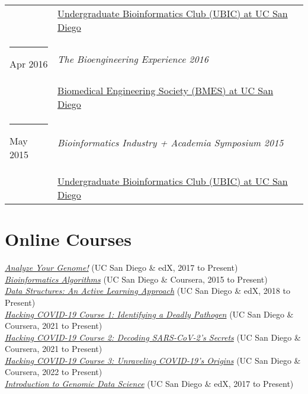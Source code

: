 \documentclass[margin,line]{res}
\begin{document}
\begin{resume}
\begin{longtable}{@{}p{0.7in}p{4in}}
\hspace*{-4mm} & \hspace{4mm} \href{http://ubicucsd.github.io/}{Undergraduate Bioinformatics Club (UBIC) at UC San Diego}\\
\hspace*{-4mm} \rule{-1mm}{5mm} Apr 2016 & \textit{The Bioengineering Experience 2016}\\*
\hspace*{-4mm} & \hspace{4mm} \href{http://bmes.ucsd.edu/}{Biomedical Engineering Society (BMES) at UC San Diego}\\
\hspace*{-4mm} \rule{-1mm}{5mm} May 2015 & \textit{Bioinformatics Industry + Academia Symposium 2015}\\*
\hspace*{-4mm} & \hspace{4mm} \href{http://ubicucsd.github.io/}{Undergraduate Bioinformatics Club (UBIC) at UC San Diego}\\
\end{longtable}

\section{\sc Online Courses}
\href{https://www.edx.org/course/analyze-genome-uc-san-diegox-binf180-1}{\textit{Analyze Your Genome!}} (UC San Diego \& edX, 2017 to Present)\vspace{2mm}\\
\href{https://www.coursera.org/specializations/bioinformatics}{\textit{Bioinformatics Algorithms}} (UC San Diego \& Coursera, 2015 to Present)\vspace{2mm}\\
\href{https://www.edx.org/course/data-structures-an-active-learning-approach}{\textit{Data Structures: An Active Learning Approach}} (UC San Diego \& edX, 2018 to Present)\vspace{2mm}\\
\href{https://www.coursera.org/learn/covid-19-genome-assembly}{\textit{Hacking COVID-19 Course 1: Identifying a Deadly Pathogen}} (UC San Diego \& Coursera, 2021 to Present)\vspace{2mm}\\
\href{https://www.coursera.org/learn/covid-19-genome-annotation}{\textit{Hacking COVID-19 Course 2: Decoding SARS-CoV-2's Secrets}} (UC San Diego \& Coursera, 2021 to Present)\vspace{2mm}\\
\href{https://www.coursera.org/learn/hacking-covid-19--course-3-unraveling-origins-of-covid-19}{\textit{Hacking COVID-19 Course 3: Unraveling COVID-19's Origins}} (UC San Diego \& Coursera, 2022 to Present)\vspace{2mm}\\
\href{https://www.edx.org/course/introduction-genomic-data-science-uc-san-diegox-cse181-1x}{\textit{Introduction to Genomic Data Science}} (UC San Diego \& edX, 2017 to Present)


\end{resume}
\end{document}
